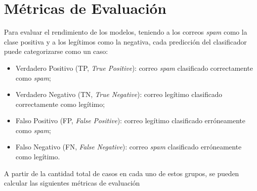 \documentclass[a4paper,11pt ,openany]{book}
\begin{document}
\section{Métricas de Evaluación}

Para evaluar el rendimiento de los modelos, teniendo a los correos \textit{spam} como la clase positiva y a los legítimos como la negativa, cada predicción del clasificador puede categorizarse como un caso:
\begin{itemize}
    \item Verdadero Positivo (TP, \textit{True Positive}): correo \textit{spam} clasificado correctamente como \textit{spam};
    \item Verdadero Negativo (TN, \textit{True Negative}): correo legítimo clasificado correctamente como legítimo;
    \item Falso Positivo (FP, \textit{False Positive}): correo legítimo clasificado erróneamente como \textit{spam};
    \item Falso Negativo (FN, \textit{False Negative}): correo \textit{spam} clasificado erróneamente como legítimo.
\end{itemize}

A partir de la cantidad total de casos en cada uno de estos grupos, se pueden calcular las siguientes métricas de evaluación
\end{document}
